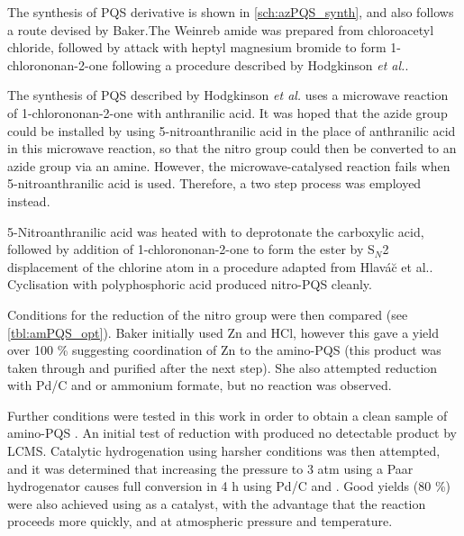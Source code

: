 The synthesis of PQS derivative  is shown in \ref{sch:azPQS_synth}, and also follows a route devised by Baker\cite{Baker2015}.The Weinreb amide \cite{Hodgkinson2011} was prepared from chloroacetyl chloride, followed by attack with heptyl magnesium bromide  to form 1-chlorononan-2-one  following a procedure described by Hodgkinson \textit{et al.}\cite{Hodgkinson2012}. 

The synthesis of PQS described by Hodgkinson \textit{et al.}\cite{Hodgkinson2012} uses a microwave reaction of 1-chlorononan-2-one  with anthranilic acid. It was hoped that the azide group could be installed by using 5-nitroanthranilic acid  in the place of anthranilic acid in this microwave reaction, so that the nitro group could then be converted to an azide group via an amine. However, the microwave-catalysed reaction fails when 5-nitroanthranilic acid  is used\cite{Baker2015}. Therefore, a two step process was employed instead. 

5-Nitroanthranilic acid  was heated with  to deprotonate the carboxylic acid, followed by addition of 1-chlorononan-2-one  to form the ester  by S$_N$2 displacement of the chlorine atom in a procedure adapted from Hlav\'a\u c et al.\cite{Hlavac2004}. Cyclisation with polyphosphoric acid produced nitro-PQS  cleanly\cite{Hlavac2004,Hradil1999}. 

Conditions for the reduction of the nitro group were then compared (see \ref{tbl:amPQS_opt}). Baker initially used Zn and HCl, however this gave a yield over 100 \% suggesting coordination of Zn to the amino-PQS \cite{Baker2015} (this product was taken through and purified after the next step). She also attempted reduction with Pd/C and  or ammonium formate, but no reaction was observed.

Further conditions were tested in this work in order to obtain a clean sample of amino-PQS .
An initial test of reduction with  produced no detectable product by LCMS. 
Catalytic hydrogenation using harsher conditions was then attempted, and it was determined that increasing the pressure to 3 atm using a Paar hydrogenator causes full conversion in 4 h using Pd/C and . 
Good yields (80 \%) were also achieved using  as a catalyst, with the advantage that the reaction proceeds more quickly, and at atmospheric pressure and temperature\cite{Shen2006a}. 

